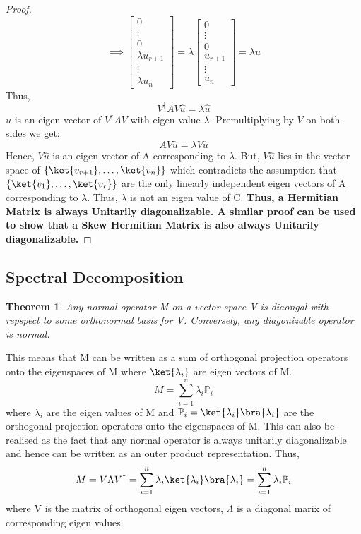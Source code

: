 \documentclass[12pt, oneside]{book}
\newtheorem{theorem}{Theorem}[section]
\theoremstyle{definition}
\theoremstyle{definition}
\theoremstyle{remark}
\begin{document}
\begin{proof}
    \[ \implies \begin{bmatrix} 0 \\ \vdots \\ 0 \\ \lambda u_{r+1} \\ \vdots \\ \lambda u_n \end{bmatrix}=\lambda \begin{bmatrix} 0 \\ \vdots \\ 0 \\ u_{r+1} \\ \vdots \\ u_n \end{bmatrix} = \lambda \hat{u} \]
    Thus, 
    \[V^{\dagger}AV\hat{u}=\lambda \hat{u}\] 
    $\hat{u}$ is an eigen vector of $V^{\dagger}AV$ with eigen value $\lambda$.
    Premultiplying by $V$ on both sides we get:
    \[AV\hat{u}=\lambda V\hat{u}\]
    Hence, $V\hat{u}$ is an eigen vector of A corresponding to $\lambda$. But, 
    $V\hat{u}$ lies in the vector space of $\{\ket{v_{r+1}}, \ldots, \ket{v_n}\}$ which contradicts the assumption that 
    $\{\ket{v_1},\ldots,\ket{v_r}\}$ are the only linearly independent eigen vectors of A corresponding to $\lambda$. Thus, $\lambda$ is not an eigen value of C.
    \textbf{Thus, a Hermitian Matrix is always Unitarily diagonalizable. A similar proof can be used to show that a Skew Hermitian Matrix is also always Unitarily diagonalizable.}  
\end{proof}

\subsection{Spectral Decomposition}
\begin{theorem} 
    Any normal operator M on a vector space V is diaongal with repspect to some orthonormal basis for V. 
    Conversely, any diagonizable operator is normal.
\end{theorem}
This means that M can be written as a sum of orthogonal projection operators onto the eigenspaces of M where $\ket{\lambda_i}$ are 
eigen vectors of M.
\[ M=\sum_{i=1}^n \lambda_i \mathbb{P}_i \]
where $\lambda_i$ are the eigen values of M and 
$\mathbb{P}_i = \ket{\lambda_i}\bra{\lambda_i}$ are the orthogonal projection operators onto the eigenspaces of M. 
This can also be realised as the fact that any normal operator is always unitarily diagonalizable and hence can be written as
an outer product representation. Thus, 
\[M = V\Lambda V^{\dagger} = \sum_{i=1}^n \lambda_i \ket{\lambda_i}\bra{\lambda_i} = \sum_{i=1}^n \lambda_i \mathbb{P}_i \]
where V is the matrix of orthogonal eigen vectors, $\Lambda$ is a diagonal marix of corresponding eigen values.
\end{document}
